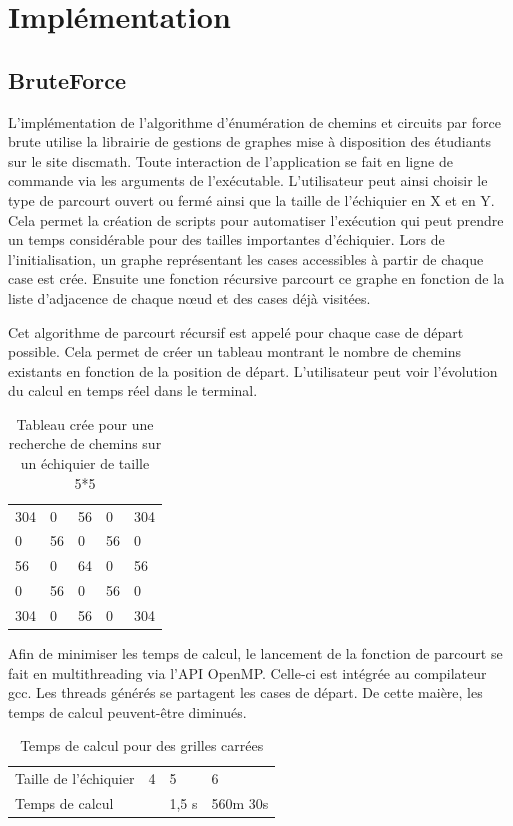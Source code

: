 \section{Implémentation}
\subsection{BruteForce}
L'implémentation de l’algorithme d’énumération de chemins et circuits par force brute utilise la librairie de gestions de graphes mise à disposition des étudiants sur le site discmath. Toute interaction de l’application se fait en ligne de commande via les arguments de l’exécutable. L’utilisateur peut ainsi choisir le type de parcourt ouvert ou fermé ainsi que la taille de l’échiquier en X et en Y.  Cela permet la création de scripts pour automatiser l’exécution qui peut prendre un temps considérable pour des tailles importantes d’échiquier.
Lors de l’initialisation, un graphe représentant les cases accessibles à partir de chaque case est crée. Ensuite une fonction récursive parcourt ce graphe en fonction de la liste d’adjacence de chaque nœud et des cases déjà visitées.

Cet algorithme de parcourt récursif est appelé pour chaque case de départ possible. Cela permet de créer un tableau montrant le nombre de chemins existants en fonction de la position de départ. L’utilisateur peut voir l’évolution du calcul en temps réel dans le terminal.
\begin{table}[H]
\centering
\caption{Tableau crée pour une recherche de chemins sur un échiquier de taille 5*5}
\label{my-label}
\begin{tabular}{lllll}
304 & 0  & 56 & 0  & 304 \\
0   & 56 & 0  & 56 & 0   \\
56  & 0  & 64 & 0  & 56  \\
0   & 56 & 0  & 56 & 0   \\
304 & 0  & 56 & 0  & 304
\end{tabular}
\end{table}

Afin de minimiser les temps de calcul, le lancement de la fonction de parcourt se fait en multithreading via l'API OpenMP. Celle-ci est intégrée au compilateur gcc. Les threads générés se partagent les cases de départ. De cette maière, les temps de calcul peuvent-être diminués.

\begin{table}[H]
\centering
\caption{Temps de calcul pour des grilles carrées}
\label{my-label1}
\begin{tabular}{llll}
\cline{1-1}
\multicolumn{1}{|l|}{Taille de l'échiquier} & 4 & 5     & 6        \\ \cline{1-1}
Temps de calcul                             &   & 1,5 s & 560m 30s
\end{tabular}
\end{table}

